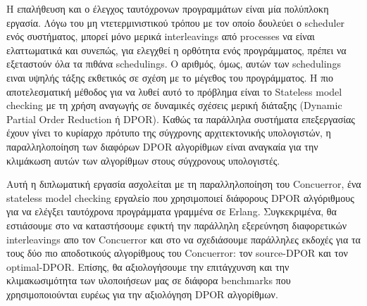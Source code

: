 Η επαλήθευση και ο έλεγχος ταυτόχρονων προγραμμάτων είναι μία πολύπλοκη εργασία. Λόγω του μη ντετερμινιστικού τρόπου με τον οποίο
δουλεύει ο scheduler ενός συστήματος, μπορεί μόνο μερικά interleavings από processes να είναι ελαττωματικά και συνεπώς, 
για ελεγχθεί η ορθότητα ενός προγράμματος, πρέπει να εξεταστούν όλα τα πιθάνα schedulings. Ο αριθμός, όμως, αυτών των 
schedulings ειναι υψηλής τάξης εκθετικός σε σχέση με το μέγεθος του προγράμματος. Η πιο αποτελεσματική μέθοδος για να λυθεί αυτό
το πρόβλημα είναι το Stateless model checking με τη χρήση αναγωγής σε δυναμικές
σχέσεις μερική διάταξης (Dynamic Partial Order Reduction ή DPOR). Καθώς τα παράλληλα συστήματα επεξεργασίας έχουν
γίνει το κυρίαρχο πρότυπο της σύγχρονης αρχιτεκτονικής υπολογιστών, η παραλληλοποίηση των διαφόρων DPOR αλγορίθμων είναι 
αναγκαία για την κλιμάκωση αυτών των αλγορίθμων στους σύγχρονους υπολογιστές.

Αυτή η διπλωματική εργασία ασχολείται με τη παραλληλοποίηση του Concuerror, ένα stateless model checking εργαλείο που χρησιμοποιεί
διάφορους DPOR αλγόριθμους για να ελέγξει ταυτόχρονα προγράμματα γραμμένα σε Erlang. Συγκεκριμένα, θα εστιάσουμε στο
να καταστήσουμε εφικτή την παράλληλη εξερεύνηση διαφορετικών interleavings απο τον Concuerror και στο να σχεδιάσουμε 
παράλληλες εκδοχές για τα τους δύο πιο αποδοτικούς αλγορίθμους του Concuerror: τον source-DPOR και τον optimal-DPOR.
Επίσης, θα αξιολογήσουμε την επιτάγχυνση και την κλιμακωσιμότητα των υλοποιήσεων μας σε διάφορα benchmarks που 
χρησιμοποιούνται ευρέως για την αξιολόγηση DPOR αλγορίθμων. 

